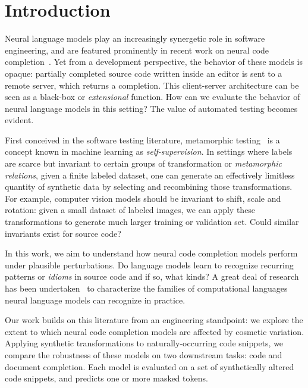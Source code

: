 \documentclass[sigconf,review,anonymous]{acmart}
\begin{document}
  \maketitle

  \section{Introduction}\label{sec:introduction}

  Neural language models play an increasingly synergetic role in software engineering, and are featured prominently in recent work on neural code completion~\cite{chen2021evaluating}. Yet from a development perspective, the behavior of these models is opaque: partially completed source code written inside an editor is sent to a remote server, which returns a completion. This client-server architecture can be seen as a black-box or \textit{extensional} function. How can we evaluate the behavior of neural language models in this setting? The value of automated testing becomes evident.

  First conceived in the software testing literature, metamorphic testing~\cite{chen1995metamorphic} is a concept known in machine learning as \textit{self-supervision}. In settings where labels are scarce but invariant to certain groups of transformation or \textit{metamorphic relations}, given a finite labeled dataset, one can generate an effectively limitless quantity of synthetic data by selecting and recombining those transformations. For example, computer vision models should be invariant to shift, scale and rotation: given a small dataset of labeled images, we can apply these transformations to generate much larger training or validation set. Could similar invariants exist for source code?

  In this work, we aim to understand how neural code completion models perform under plausible perturbations. Do language models learn to recognize recurring patterns or \textit{idioms} in source code and if so, what kinds? A great deal of research has been undertaken~\citep{weiss2018practical, chirkova2020empirical, chen2021evaluating} to characterize the families of computational languages neural language models can recognize in practice.

  Our work builds on this literature from an engineering standpoint: we explore the extent to which neural code completion models are affected by cosmetic variation. Applying synthetic transformations to naturally-occurring code snippets, we compare the robustness of these models on two downstream tasks: code and document completion. Each model is evaluated on a set of synthetically altered code snippets, and predicts one or more masked tokens.
\end{document}
